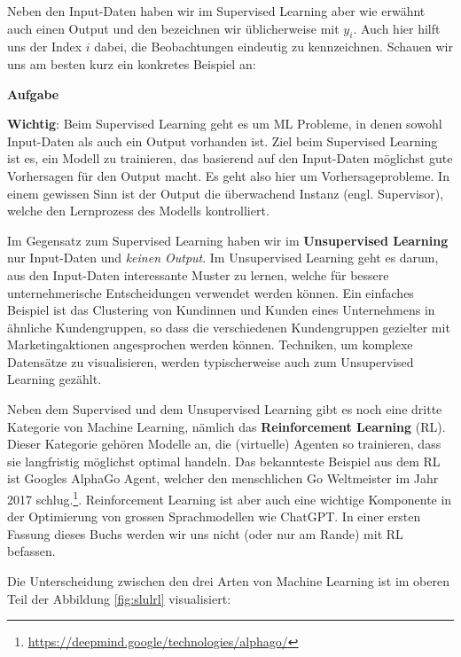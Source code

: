 \documentclass[
]{book}
\begin{document}
Neben den Input-Daten haben wir im Supervised Learning aber wie erwähnt auch einen Output und den bezeichnen wir üblicherweise mit \(y_i\). Auch hier hilft uns der Index \(i\) dabei, die Beobachtungen eindeutig zu kennzeichnen. Schauen wir uns am besten kurz ein konkretes Beispiel an:

\textbf{Aufgabe}

\textbf{Wichtig}: Beim Supervised Learning geht es um ML Probleme, in denen sowohl Input-Daten als auch ein Output vorhanden ist. Ziel beim Supervised Learning ist es, ein Modell zu trainieren, das basierend auf den Input-Daten möglichst gute Vorhersagen für den Output macht. Es geht also hier um Vorhersageprobleme. In einem gewissen Sinn ist der Output die überwachend Instanz (engl. Supervisor), welche den Lernprozess des Modells kontrolliert.

Im Gegensatz zum Supervised Learning haben wir im \textbf{Unsupervised Learning} nur Input-Daten und \emph{keinen Output}. Im Unsupervised Learning geht es darum, aus den Input-Daten interessante Muster zu lernen, welche für bessere unternehmerische Entscheidungen verwendet werden können. Ein einfaches Beispiel ist das Clustering von Kundinnen und Kunden eines Unternehmens in ähnliche Kundengruppen, so dass die verschiedenen Kundengruppen gezielter mit Marketingaktionen angesprochen werden können. Techniken, um komplexe Datensätze zu visualisieren, werden typischerweise auch zum Unsupervised Learning gezählt.

Neben dem Supervised und dem Unsupervised Learning gibt es noch eine dritte Kategorie von Machine Learning, nämlich das \textbf{Reinforcement Learning} (RL). Dieser Kategorie gehören Modelle an, die (virtuelle) Agenten so trainieren, dass sie langfristig möglichst optimal handeln. Das bekannteste Beispiel aus dem RL ist Googles AlphaGo Agent, welcher den menschlichen Go Weltmeister im Jahr 2017 schlug.\footnote{\url{https://deepmind.google/technologies/alphago/}}. Reinforcement Learning ist aber auch eine wichtige Komponente in der Optimierung von grossen Sprachmodellen wie ChatGPT. In einer ersten Fassung dieses Buchs werden wir uns nicht (oder nur am Rande) mit RL befassen.

Die Unterscheidung zwischen den drei Arten von Machine Learning ist im oberen Teil der Abbildung \ref{fig:slulrl} visualisiert:
\end{document}
